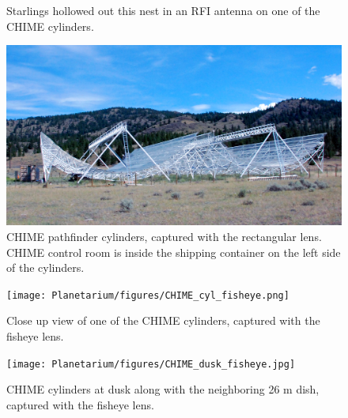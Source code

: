 \begin{figure}[htb]
\begin{minipage}[b]{0.37\textwidth}
\caption{Starlings hollowed out this nest in an RFI antenna on one of the CHIME cylinders.}
\label{Fig:CHIME_bird}
\end{minipage}
\end{figure}

\begin{figure}[htb]
\begin{center}
\includegraphics[width=0.95\linewidth]{Planetarium/figures/CHIME_cylinders.jpg}
\caption{CHIME pathfinder cylinders, captured with the rectangular lens. CHIME control room is inside the shipping container on the left side of the cylinders.}
\label{Fig:CHIME_cyl}
\end{center}
\end{figure}

\begin{figure}[htb]
\centering
\begin{minipage}[b]{0.51\textwidth}
\centering
\texttt{[image: Planetarium/figures/CHIME\_cyl\_fisheye.png]}
\caption{Close up view of one of the CHIME cylinders, captured with the fisheye lens.}
\label{Fig:CHIME_cyl_fisheye}
\end{minipage}%
\begin{minipage}[b]{0.02\textwidth}
\hspace{1cm}
\end{minipage}%
\begin{minipage}[b]{0.43\textwidth}
\centering
\texttt{[image: Planetarium/figures/CHIME\_dusk\_fisheye.jpg]}
\caption{CHIME cylinders at dusk along with the neighboring 26 m dish, captured with the fisheye lens.}
\label{Fig:CHIME_dusk_fisheye}
\end{minipage}
\end{figure}

